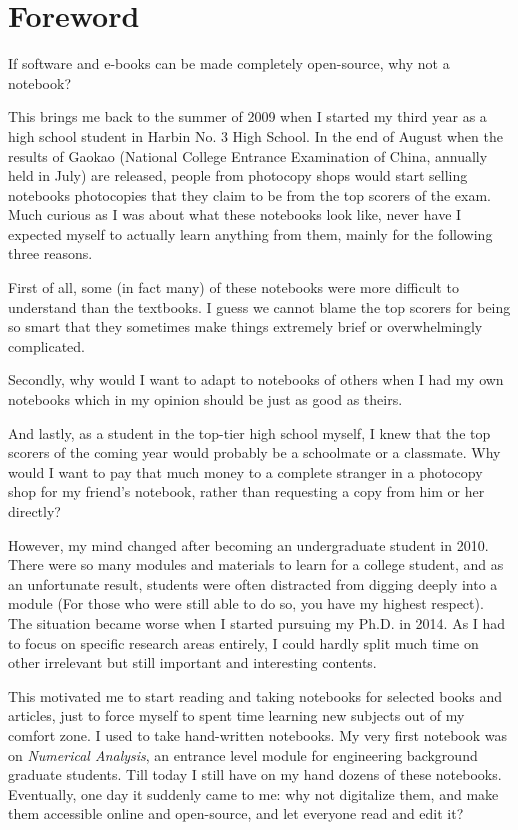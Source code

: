 \chapter*{Foreword}
If software and e-books can be made completely open-source, why not a notebook?

This brings me back to the summer of 2009 when I started my third year as a high school student in Harbin No. 3 High School. In the end of August when the results of Gaokao (National College Entrance Examination of China, annually held in July) are released, people from photocopy shops would start selling notebooks photocopies that they claim to be from the top scorers of the exam. Much curious as I was about what these notebooks look like, never have I expected myself to actually learn anything from them, mainly for the following three reasons.

First of all, some (in fact many) of these notebooks were more difficult to understand than the textbooks. I guess we cannot blame the top scorers for being so smart that they sometimes make things extremely brief or overwhelmingly complicated.

Secondly, why would I want to adapt to notebooks of others when I had my own notebooks which in my opinion should be just as good as theirs.

And lastly, as a student in the top-tier high school myself, I knew that the top scorers of the coming year would probably be a schoolmate or a classmate. Why would I want to pay that much money to a complete stranger in a photocopy shop for my friend's notebook, rather than requesting a copy from him or her directly?

However, my mind changed after becoming an undergraduate student in 2010. There were so many modules and materials to learn for a college student, and as an unfortunate result, students were often distracted from digging deeply into a module (For those who were still able to do so, you have my highest respect). The situation became worse when I started pursuing my Ph.D. in 2014. As I had to focus on specific research areas entirely, I could hardly split much time on other irrelevant but still important and interesting contents.

This motivated me to start reading and taking notebooks for selected books and articles, just to force myself to spent time learning new subjects out of my comfort zone. I used to take hand-written notebooks. My very first notebook was on \textit{Numerical Analysis}, an entrance level module for engineering background graduate students. Till today I still have on my hand dozens of these notebooks. Eventually, one day it suddenly came to me: why not digitalize them, and make them accessible online and open-source, and let everyone read and edit it?

